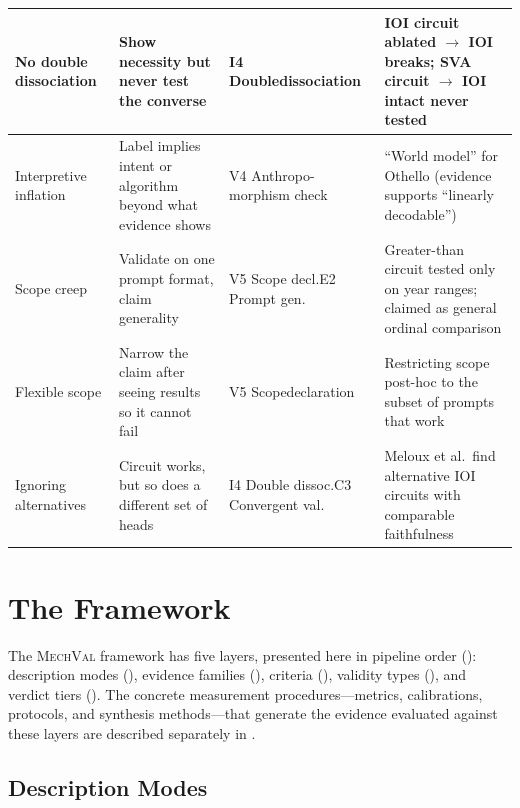 \documentclass{article}
\newcommand{\mechval}{\textsc{MechVal}}
\begin{document}
\begin{table}[H]
\begin{tabular}{@{}l>{\raggedright\arraybackslash}p{3.2cm}>{\raggedright\arraybackslash}p{2.8cm}>{\raggedright\arraybackslash}p{4.0cm}@{}}
\midrule
No double dissociation & Show necessity but never test the converse & I4 Double\newline dissociation & IOI circuit ablated $\to$ IOI breaks; SVA circuit $\to$ IOI intact never tested \\
\midrule
Interpretive inflation & Label implies intent or algorithm beyond what evidence shows & V4 Anthropo-\newline morphism check & ``World model'' for Othello (evidence supports ``linearly decodable'') \\
\midrule
Scope creep & Validate on one prompt format, claim generality & V5 Scope decl.\newline E2 Prompt gen. & Greater-than circuit tested only on year ranges; claimed as general ordinal comparison \\
\midrule
Flexible scope & Narrow the claim after seeing results so it cannot fail & V5 Scope\newline declaration & Restricting scope post-hoc to the subset of prompts that work \\
\midrule
Ignoring alternatives & Circuit works, but so does a different set of heads & I4 Double dissoc.\newline C3 Convergent val. & Meloux et al.\ find alternative IOI circuits with comparable faithfulness \\
\bottomrule
\end{tabular}
\end{table}
\endgroup


\section{The Framework}
\label{sec:framework}


The \mechval{} framework has five layers, presented here in pipeline order (): description modes (), evidence families (), criteria (), validity types (), and verdict tiers (). The concrete measurement procedures---metrics, calibrations, protocols, and synthesis methods---that generate the evidence evaluated against these layers are described separately in .

\subsection{Description Modes}
\label{sec:description-modes}
\end{document}
